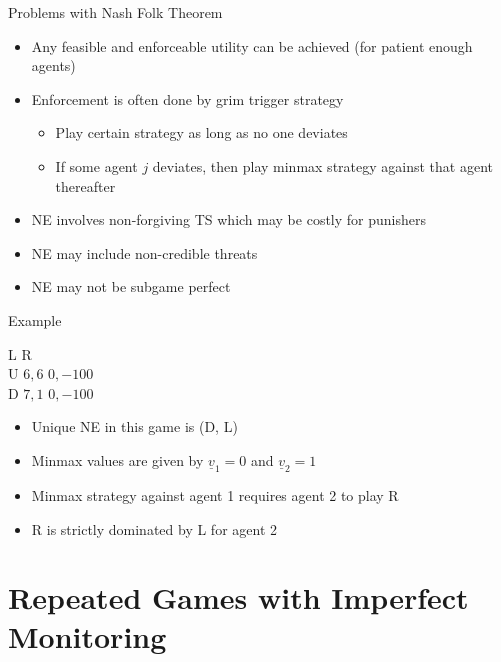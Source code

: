 \documentclass[11pt,aspectratio=169]{beamer}
\begin{document}
  
  \begin{frame}{Problems with Nash Folk Theorem}
   \begin{itemize}[<+->]
    \setlength{\itemsep}{1em}
    \item Any feasible and enforceable utility can be achieved (for \alert{patient enough} agents)
    \item Enforcement is often done by grim trigger strategy
    \begin{itemize}
     \item Play certain strategy as long as no one deviates
     \item If some agent $j$  deviates, then play minmax strategy against that agent thereafter
    \end{itemize}
    \item NE involves non-forgiving TS which may be costly for punishers
    \item NE may include \alert{non-credible threats}
    \item NE may not be subgame perfect
   \end{itemize}
  \end{frame}
  
  
  \begin{frame}{Example}
   \begin{center}
    \hspace{-0.2em}
    \begin{game}{2}{2}
     	\> L			\> R				\\
     U	\> $6, 6$	\> $ 0, -100$	\\
     D	\> $7, 1$	\> $ 0, -100$
    \end{game}
   \end{center}
   \vspace{1em}
   \begin{itemize}
    \item Unique NE in this game is (D, L)
    \item Minmax values are given by $\underline{v}_{1} = 0 $ and $\underline{v}_{2} = 1 $ 
    \item Minmax strategy against agent 1 requires agent 2 to play R
    \item R is strictly dominated by L for agent 2
   \end{itemize}
  \end{frame}
  
 \section{Repeated Games with Imperfect Monitoring}
 
\end{document}
